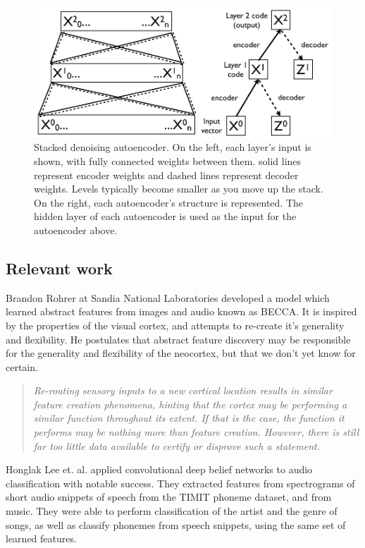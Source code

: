 \documentclass[12pt]{article}
\begin{document}
\begin{doublespacing}
\begin{figure}[p]
\centering
\includegraphics[width=6in]{sda_fig_}
\caption{Stacked denoising autoencoder. On the left, each layer's input is shown, with fully connected weights between them. solid lines represent encoder weights and dashed lines represent decoder weights. Levels typically become smaller as you move up the stack. On the right, each autoencoder's structure is represented. The hidden layer of each autoencoder is used as the input for the autoencoder above. }
\end{figure}

	\subsection{Relevant work}
	Brandon Rohrer at Sandia National Laboratories developed a model which learned abstract features from images and audio known as BECCA. It is inspired by the properties of the visual cortex, and attempts to re-create it's generality and flexibility. He postulates that abstract feature discovery may be responsible for the generality and flexibility of the neocortex, but that we don't yet know for certain.
\begin{quote}
\singlespacing
\em Re-routing sensory inputs to a new cortical location results in similar feature creation phenomena, hinting that the cortex may be performing a similar function throughout its extent. If that is the case, the function it performs may be nothing more than feature creation. However, there is still far too little data available to certify or disprove such a statement.\cite{rohrer2011biologically}
\end{quote}

Honglak Lee et. al. applied convolutional deep belief networks to audio classification with notable success. They extracted features from spectrograms of short audio snippets of speech from the TIMIT phoneme dataset, and from music. They were able to perform classification of the artist and the genre of songs, as well as classify phonemes from speech snippets, using the same set of learned features.\cite{lee2009unsupervised}


\end{doublespacing}
\end{document}
